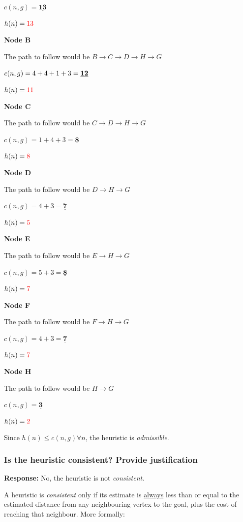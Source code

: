 \documentclass[12pt, letterpaper]{article}
\begin{document}
$c(n,g)=\underline{\textbf{13}}$

$h(n)=\textcolor{red}{13}$

\textbf{Node B}

The path to follow would be $B\rightarrow C\rightarrow D\rightarrow H\rightarrow G$

$c(n,g)=4+4+1+3=\textbf{\underline{12}}$

$h(n)=\textcolor{red}{11}$

\textbf{Node C}

The path to follow would be $C\rightarrow D\rightarrow H\rightarrow G$

$c(n,g)=1+4+3=\underline{\textbf{8}}$

$h(n)=\textcolor{red}{8}$

\textbf{Node D}

The path to follow would be $D\rightarrow H\rightarrow G$

$c(n,g)=4+3=\underline{\textbf{7}}$ 

$h(n)=\textcolor{red}{5}$

\textbf{Node E}

The path to follow would be $E\rightarrow H\rightarrow G$

$c(n,g)=5+3=\underline{\textbf{8}}$ 

$h(n)=\textcolor{red}{7}$

\textbf{Node F}

The path to follow would be $F\rightarrow H\rightarrow G$

$c(n,g)=4+3=\underline{\textbf{7}}$ 

$h(n)=\textcolor{red}{7}$

\textbf{Node H}

The path to follow would be $H\rightarrow G$

$c(n,g)=\underline{\textbf{3}}$ 

$h(n)=\textcolor{red}{2}$

Since $h(n)\leq c(n,g) \forall n$, the heuristic is \textit{admissible}.

\subsubsection{Is the heuristic consistent? Provide justification}
\textbf{Response:} No, the heuristic is not \textit{consistent}.

A heuristic is \textit{consistent} only if its estimate is \underline{always} less than or equal to the estimated distance from any neighbouring vertex to the goal, plus the cost of reaching that neighbour. More formally:
\end{document}
